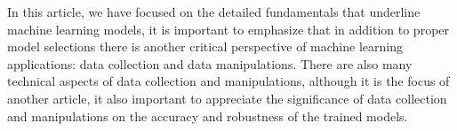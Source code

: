 
\par
In this article, we have focused on the detailed fundamentals that underline machine learning models, it is important to emphasize that in addition to proper model selections there is another critical perspective of machine learning applications: data collection and data manipulations. There are also many technical aspects of data collection and manipulations, although it is the focus of another article, it also important to appreciate the significance of data collection and manipulations on the accuracy and robustness of the trained models.
\par 
